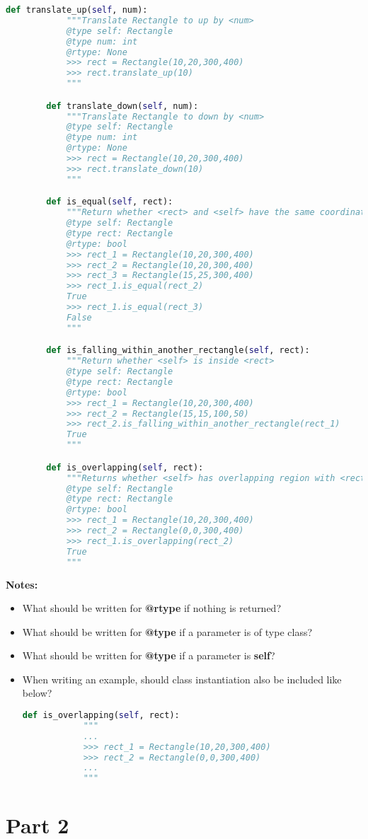 \documentclass[12pt]{article}
\begin{document}
\begin{enumerate}
\begin{lstlisting}[language=Python]
        def translate_up(self, num):
            """Translate Rectangle to up by <num>
            @type self: Rectangle
            @type num: int
            @rtype: None
            >>> rect = Rectangle(10,20,300,400)
            >>> rect.translate_up(10)
            """

        def translate_down(self, num):
            """Translate Rectangle to down by <num>
            @type self: Rectangle
            @type num: int
            @rtype: None
            >>> rect = Rectangle(10,20,300,400)
            >>> rect.translate_down(10)
            """

        def is_equal(self, rect):
            """Return whether <rect> and <self> have the same coordinate and size
            @type self: Rectangle
            @type rect: Rectangle
            @rtype: bool
            >>> rect_1 = Rectangle(10,20,300,400)
            >>> rect_2 = Rectangle(10,20,300,400)
            >>> rect_3 = Rectangle(15,25,300,400)
            >>> rect_1.is_equal(rect_2)
            True
            >>> rect_1.is_equal(rect_3)
            False
            """

        def is_falling_within_another_rectangle(self, rect):
            """Return whether <self> is inside <rect>
            @type self: Rectangle
            @type rect: Rectangle
            @rtype: bool
            >>> rect_1 = Rectangle(10,20,300,400)
            >>> rect_2 = Rectangle(15,15,100,50)
            >>> rect_2.is_falling_within_another_rectangle(rect_1)
            True
            """

        def is_overlapping(self, rect):
            """Returns whether <self> has overlapping region with <rect>
            @type self: Rectangle
            @type rect: Rectangle
            @rtype: bool
            >>> rect_1 = Rectangle(10,20,300,400)
            >>> rect_2 = Rectangle(0,0,300,400)
            >>> rect_1.is_overlapping(rect_2)
            True
            """
    \end{lstlisting}

    \bigskip

    \textbf{Notes:}

    \begin{itemize}
    \item What should be written for \textbf{@rtype} if nothing is returned?
    \item What should be written for \textbf{@type} if a parameter is of type class?
    \item What should be written for \textbf{@type} if a parameter is \textbf{self}?
    \item When writing an example, should class instantiation also be included like below?

    \begin{lstlisting}[language=Python]
        def is_overlapping(self, rect):
            """
            ...
            >>> rect_1 = Rectangle(10,20,300,400)
            >>> rect_2 = Rectangle(0,0,300,400)
            ...
            """
    \end{lstlisting}
    \end{itemize}
\end{enumerate}

\section*{Part 2}
\end{document}

